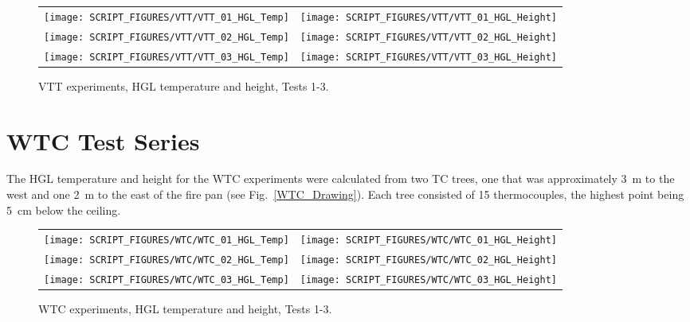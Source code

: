 \begin{figure}[h!]
\begin{tabular*}{\textwidth}{l@{\extracolsep{\fill}}r}
\texttt{[image: SCRIPT\_FIGURES/VTT/VTT\_01\_HGL\_Temp]} &
\texttt{[image: SCRIPT\_FIGURES/VTT/VTT\_01\_HGL\_Height]} \\
\texttt{[image: SCRIPT\_FIGURES/VTT/VTT\_02\_HGL\_Temp]} &
\texttt{[image: SCRIPT\_FIGURES/VTT/VTT\_02\_HGL\_Height]} \\
\texttt{[image: SCRIPT\_FIGURES/VTT/VTT\_03\_HGL\_Temp]} &
\texttt{[image: SCRIPT\_FIGURES/VTT/VTT\_03\_HGL\_Height]}
\end{tabular*}
\caption[VTT experiments, HGL temperature and height, Tests 1-3]
{VTT experiments, HGL temperature and height, Tests 1-3.}
\label{VTT_HGL}
\end{figure}



\clearpage



\section{WTC Test Series}

The HGL temperature and height for the WTC experiments were calculated from two TC trees, one that was approximately 3~m to the west and one
2~m to the east of the fire pan (see Fig.~\ref{WTC_Drawing}). Each tree consisted of 15 thermocouples, the highest point being 5~cm below the ceiling.

\begin{figure}[!h]
\begin{tabular*}{\textwidth}{l@{\extracolsep{\fill}}r}
\texttt{[image: SCRIPT\_FIGURES/WTC/WTC\_01\_HGL\_Temp]} &
\texttt{[image: SCRIPT\_FIGURES/WTC/WTC\_01\_HGL\_Height]} \\
\texttt{[image: SCRIPT\_FIGURES/WTC/WTC\_02\_HGL\_Temp]} &
\texttt{[image: SCRIPT\_FIGURES/WTC/WTC\_02\_HGL\_Height]} \\
\texttt{[image: SCRIPT\_FIGURES/WTC/WTC\_03\_HGL\_Temp]} &
\texttt{[image: SCRIPT\_FIGURES/WTC/WTC\_03\_HGL\_Height]}
\end{tabular*}
\caption[WTC experiments, HGL temperature and height, Tests 1-3]
{WTC experiments, HGL temperature and height, Tests 1-3.}
\label{WTC_HGL_1}
\end{figure}

\newpage

